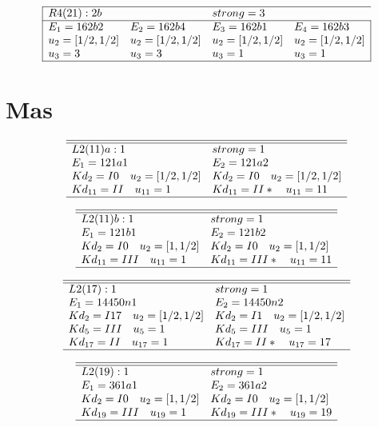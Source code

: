 \documentclass[11pt]{article}
\theoremstyle{definition}
\begin{document}
$$
 \begin{array}{|llll|} 
\hline 
  R4(21):2b  &   & strong=3\\
\hline
 E_1=162b2 & E_2=162b4 & E_3=162b1 & E_4=162b3 \\
  u_{2}=[ 1/2, 1/2 ]&  u_{2}=[ 1/2, 1/2 ]&  u_{2}=[ 1/2, 1/2 ]&  u_{2}=[ 1/2, 1/2 ]\\
  u_{3}=3&  u_{3}=3&  u_{3}=1&  u_{3}=1\\
\hline
\end{array}
 $$


 
\newpage
\section{Mas}
$$
 \begin{array}{ll}
 \hline 
\hline 
  L2(11)a:1  & strong=1\\
 E_1=121a1 & E_2=121a2 \\
  Kd_{2}=I0\quad u_{2}=[ 1/2, 1/2 ]&  Kd_{2}=I0\quad u_{2}=[ 1/2, 1/2 ]\\
  Kd_{11}=II\quad u_{11}=1&  Kd_{11}=II*\quad u_{11}=11\\
\hline
\end{array}
 $$


$$
 \begin{array}{ll}
 \hline 
\hline 
  L2(11)b:1  & strong=1\\
 E_1=121b1 & E_2=121b2 \\
  Kd_{2}=I0\quad u_{2}=[ 1, 1/2 ]&  Kd_{2}=I0\quad u_{2}=[ 1, 1/2 ]\\
  Kd_{11}=III\quad u_{11}=1&  Kd_{11}=III*\quad u_{11}=11\\
\hline
\end{array}
 $$


$$
 \begin{array}{ll}
 \hline 
\hline 
  L2(17):1  & strong=1\\
 E_1=14450n1 & E_2=14450n2 \\
  Kd_{2}=I17\quad u_{2}=[ 1/2, 1/2 ]&  Kd_{2}=I1\quad u_{2}=[ 1/2, 1/2 ]\\
  Kd_{5}=III\quad u_{5}=1&  Kd_{5}=III\quad u_{5}=1\\
  Kd_{17}=II\quad u_{17}=1&  Kd_{17}=II*\quad u_{17}=17\\
\hline
\end{array}
 $$


$$
 \begin{array}{ll}
 \hline 
\hline 
  L2(19):1  & strong=1\\
 E_1=361a1 & E_2=361a2 \\
  Kd_{2}=I0\quad u_{2}=[ 1, 1/2 ]&  Kd_{2}=I0\quad u_{2}=[ 1, 1/2 ]\\
  Kd_{19}=III\quad u_{19}=1&  Kd_{19}=III*\quad u_{19}=19\\
\hline
\end{array}
 $$
\end{document}
